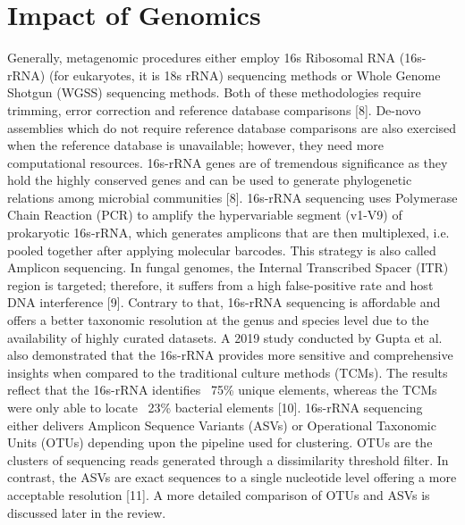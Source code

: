 \section{Impact of Genomics}
Generally, metagenomic procedures either employ 16s Ribosomal RNA (16s-rRNA) (for eukaryotes, it is 18s rRNA) sequencing methods or Whole Genome Shotgun (WGSS) sequencing methods. Both of these methodologies require trimming, error correction and reference database comparisons [8]. De-novo assemblies which do not require reference database comparisons are also exercised when the reference database is unavailable; however, they need more computational resources. 16s-rRNA genes are of tremendous significance as they hold the highly conserved genes and can be used to generate phylogenetic relations among microbial communities [8]. 16s-rRNA sequencing uses Polymerase Chain Reaction (PCR) to amplify the hypervariable segment (v1-V9) of prokaryotic 16s-rRNA, which generates amplicons that are then multiplexed, i.e. pooled together after applying molecular barcodes. This strategy is also called Amplicon sequencing. In fungal genomes, the Internal Transcribed Spacer (ITR) region is targeted; therefore,  it suffers from a high false-positive rate and host DNA interference [9]. Contrary to that, 16s-rRNA sequencing is affordable and offers a better taxonomic resolution at the genus and species level due to the availability of highly curated datasets. A 2019 study conducted by Gupta et al. also demonstrated that the 16s-rRNA provides more sensitive and comprehensive insights when compared to the traditional culture methods (TCMs). The results reflect that the 16s-rRNA identifies ~75\% unique elements, whereas the TCMs were only able to locate ~23\% bacterial elements [10]. 16s-rRNA sequencing either delivers Amplicon Sequence Variants (ASVs) or Operational Taxonomic Units (OTUs) depending upon the pipeline used for clustering. OTUs are the clusters of sequencing reads generated through a dissimilarity threshold filter. In contrast, the ASVs are exact sequences to a single nucleotide level offering a more acceptable resolution [11]. A more detailed comparison of OTUs and ASVs is discussed later in the review.

